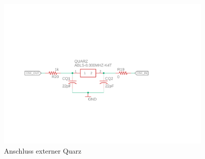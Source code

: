 \begin{figure}[H]%
\centering
\includegraphics[width=300pt]{./Bilder/quarz.pdf}%
\caption{Anschluss externer Quarz}%
\label{fig:quarz}%
\end{figure}

